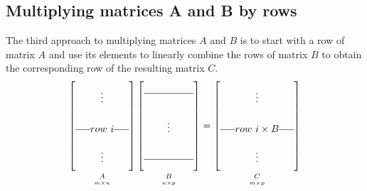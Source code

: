 \documentclass[../main.tex]{subfiles}
\begin{document}
\subsection{Multiplying matrices A and B by rows}
The third approach to multiplying matrices \(A\) and \(B\) is to start with a row of matrix \(A\) and use its elements to linearly combine the rows of matrix \(B\) to obtain the corresponding row of the resulting matrix \(C\).
\[
    \renewcommand\arraystretch{2.5}
    \underbracket[0pt][0pt]{
        \begin{bmatrix}
            \vdots                                                      \\
            \rule[.5ex]{1.5em}{0.4pt} row \ i \rule[.5ex]{1.5em}{0.4pt} \\
            \vdots
        \end{bmatrix}
    }_{\mathstrut \underset{m \times n}{A}}
    \underbracket[0pt][0pt]{
        \begin{bmatrix}
            \rule[2ex]{5em}{0.4pt} \\
            \vdots                 \\
            \rule[.5ex]{5em}{0.4pt}
        \end{bmatrix}
    }_{\mathstrut \underset{n \times p}{B}}
    =
    \underbracket[0pt][0pt]{
        \begin{bmatrix}
            \vdots                                                              \\
            \rule[.5ex]{1.5em}{0.4pt}row \ i \times B \rule[.5ex]{1.5em}{0.4pt} \\
            \vdots
        \end{bmatrix}
    }_{\mathstrut \underset{m \times p}{C}}
\]


\end{document}
